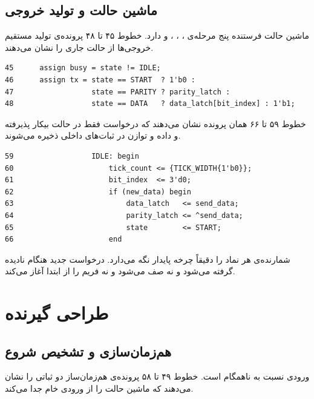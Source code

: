 \subsection{ماشین حالت و تولید خروجی}

ماشین حالت فرستنده پنج مرحله‌ی ، ، ،  و
 دارد. خطوط ۴۵ تا ۴۸ پرونده‌ی  تولید مستقیم خروجی‌ها از حالت
جاری را نشان می‌دهند.

\begin{dsdlcodeblock}
\begin{verbatim}
45      assign busy = state != IDLE;
46      assign tx = state == START  ? 1'b0 :
47                  state == PARITY ? parity_latch :
48                  state == DATA   ? data_latch[bit_index] : 1'b1;
\end{verbatim}
\end{dsdlcodeblock}

خطوط ۵۹ تا ۶۶ همان پرونده نشان می‌دهند که درخواست فقط در حالت بیکار پذیرفته و داده و
توازن در ثبات‌های داخلی ذخیره می‌شوند.

\begin{dsdlcodeblock}
\begin{verbatim}
59                  IDLE: begin
60                      tick_count <= {TICK_WIDTH{1'b0}};
61                      bit_index  <= 3'd0;
62                      if (new_data) begin
63                          data_latch   <= send_data;
64                          parity_latch <= ^send_data;
65                          state        <= START;
66                      end
\end{verbatim}
\end{dsdlcodeblock}

شمارنده‌ی  هر نماد را دقیقاً  چرخه پایدار نگه می‌دارد.
درخواست جدید هنگام  نادیده گرفته می‌شود و نه صف می‌شود و نه فریم را از ابتدا
آغاز می‌کند.

\section{طراحی گیرنده }

\subsection{هم‌زمان‌سازی و تشخیص شروع}

ورودی  نسبت به  ناهمگام است. خطوط ۴۹ تا ۵۸ پرونده‌ی
 هم‌زمان‌ساز دو ثباتی را نشان می‌دهند که ماشین حالت را از ورودی خام
جدا می‌کند.


